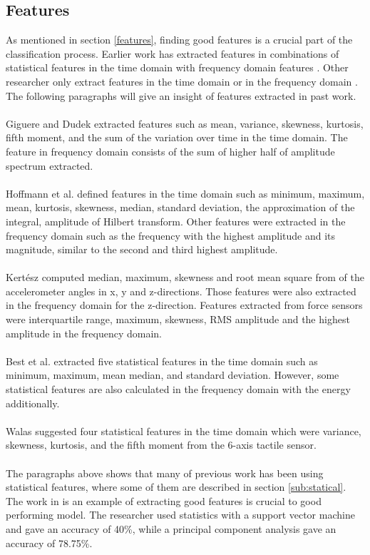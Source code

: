 \documentclass[USenglish]{ifimaster}  %
\begin{document}
\subsection{Features} \label{sub:relatedfeatures}
As mentioned in section \ref{features}, finding good features is a crucial part of the classification process. Earlier work has extracted features in combinations of statistical features in the time domain with frequency domain features \cite{5152662,Giguere2009,5509309}. Other researcher only extract features in the time domain \cite{walastactile} or in the frequency domain \cite{4543710} \cite{5979766}. The following paragraphs will give an insight of features extracted in past work.
\\
\\
Giguere and Dudek \cite{5152662} extracted features such as mean, variance, skewness, kurtosis, fifth moment, and the sum of the variation over time in the time domain. The feature in frequency domain consists of the sum of higher half of amplitude spectrum extracted.
\\
\\
Hoffmann et al. \cite{Hoffmann20141790} defined features in the time domain such as minimum, maximum, mean, kurtosis, skewness, median, standard deviation, the approximation of the integral, amplitude of Hilbert transform. Other features were extracted in the frequency domain such as the frequency with the highest amplitude and its magnitude, similar to the second and third highest amplitude.  
\\
\\
Kertész \cite{7387710} computed median, maximum, skewness and root mean square from of the accelerometer angles in x, y and z-directions. Those features were also extracted in the frequency domain for the z-direction. Features extracted from force sensors were interquartile range, maximum, skewness, RMS amplitude and the highest amplitude in the frequency domain.
\\
\\
Best et al. \cite{26b23e912c654fe4b7478fd910130195} extracted five statistical features in the time domain such as minimum, maximum, mean median, and standard deviation. However, some statistical features are also calculated in the frequency domain with the energy additionally.
\\
\\
Walas \cite{walastactile} suggested four statistical features in the time domain which were variance, skewness, kurtosis, and the fifth moment from the 6-axis tactile sensor. 
\\
\\
The paragraphs above shows that many of previous work has been using statistical features, where some of them are described in section \ref{sub:statical}. The work in \cite{5602459} is an example of extracting good features is crucial to good performing model. The researcher used statistics with a support vector machine and gave an accuracy of 40\%, while a principal component analysis gave an accuracy of 78.75\%.
	
\end{document}

